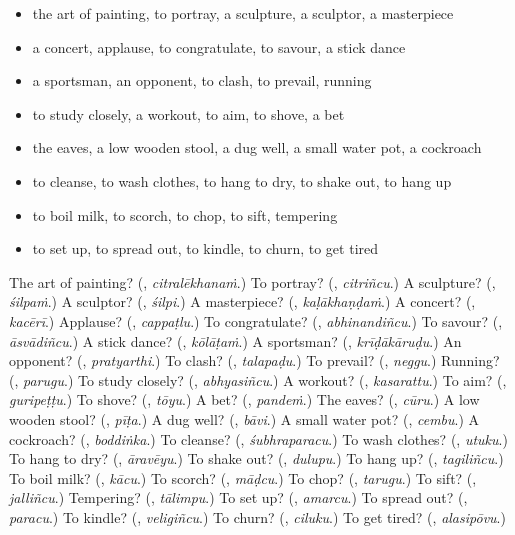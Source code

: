 \begin{itemize}
\raggedright
  \item the art of painting, to portray, a sculpture, a sculptor, a masterpiece
  \item a concert, applause, to congratulate, to savour, a stick dance
  \item a sportsman, an opponent, to clash, to prevail, running
  \item to study closely, a workout, to aim, to shove, a bet
  \item the eaves, a low wooden stool, a dug well, a small water pot, a cockroach
  \item to cleanse, to wash clothes, to hang to dry, to shake out, to hang up
  \item to boil milk, to scorch, to chop, to sift, tempering
  \item to set up, to spread out, to kindle, to churn, to get tired
\end{itemize}

\begin{tcolorbox}[breakable,colback=teal!4,colframe=teal!35!black,title={Before you move on}]
The art of painting? (\textbf{}, \emph{citralēkhanaṁ}.) To portray? (\textbf{}, \emph{citriñcu}.) A sculpture? (\textbf{}, \emph{śilpaṁ}.) A sculptor? (\textbf{}, \emph{śilpi}.) A masterpiece? (\textbf{}, \emph{kaḷākhaṇḍaṁ}.) A concert? (\textbf{}, \emph{kacērī}.) Applause? (\textbf{}, \emph{cappaṭlu}.) To congratulate? (\textbf{}, \emph{abhinandiñcu}.) To savour? (\textbf{}, \emph{āsvādiñcu}.) A stick dance? (\textbf{}, \emph{kōlāṭaṁ}.) A sportsman? (\textbf{}, \emph{krīḍākāruḍu}.) An opponent? (\textbf{}, \emph{pratyarthi}.) To clash? (\textbf{}, \emph{talapaḍu}.) To prevail? (\textbf{}, \emph{neggu}.) Running? (\textbf{}, \emph{parugu}.) To study closely? (\textbf{}, \emph{abhyasiñcu}.) A workout? (\textbf{}, \emph{kasarattu}.) To aim? (\textbf{}, \emph{guripeṭṭu}.) To shove? (\textbf{}, \emph{tōyu}.) A bet? (\textbf{}, \emph{pandeṁ}.) The eaves? (\textbf{}, \emph{cūru}.) A low wooden stool? (\textbf{}, \emph{pīṭa}.) A dug well? (\textbf{}, \emph{bāvi}.) A small water pot? (\textbf{}, \emph{cembu}.) A cockroach? (\textbf{}, \emph{boddiṅka}.) To cleanse? (\textbf{}, \emph{śubhraparacu}.) To wash clothes? (\textbf{}, \emph{utuku}.) To hang to dry? (\textbf{}, \emph{āravēyu}.) To shake out? (\textbf{}, \emph{dulupu}.) To hang up? (\textbf{}, \emph{tagiliñcu}.) To boil milk? (\textbf{}, \emph{kācu}.) To scorch? (\textbf{}, \emph{māḍcu}.) To chop? (\textbf{}, \emph{tarugu}.) To sift? (\textbf{}, \emph{jalliñcu}.) Tempering? (\textbf{}, \emph{tālimpu}.) To set up? (\textbf{}, \emph{amarcu}.) To spread out? (\textbf{}, \emph{paracu}.) To kindle? (\textbf{}, \emph{veligiñcu}.) To churn? (\textbf{}, \emph{ciluku}.) To get tired? (\textbf{}, \emph{alasipōvu}.)
\end{tcolorbox}
